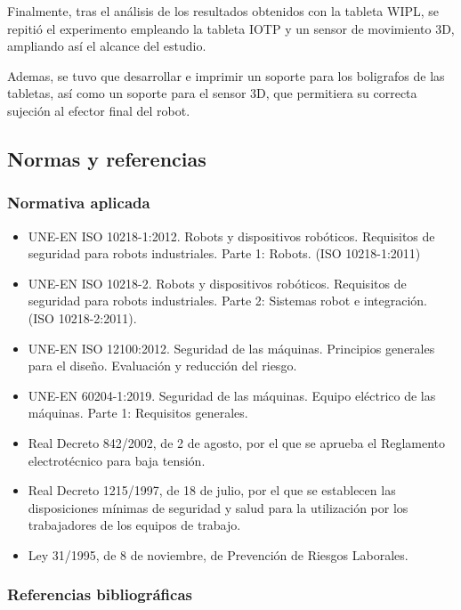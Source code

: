 \documentclass[12pt,a4paper,oneside]{report}
\begin{document}
Finalmente, tras el análisis de los resultados obtenidos con la tableta \acrfull{WIPL}, 
se repitió el experimento empleando la tableta \acrfull{IOTP} y un sensor de movimiento 3D, 
ampliando así el alcance del estudio. 

Ademas, se tuvo que desarrollar e imprimir un soporte para los boligrafos de las tabletas,
así como un soporte para el sensor 3D, que permitiera su correcta sujeción al efector final del robot.


\subsection{Normas y referencias}
\subsubsection{Normativa aplicada}
\begin{itemize}
  \item UNE-EN ISO 10218-1:2012. Robots y dispositivos robóticos. Requisitos de seguridad
para robots industriales. Parte 1: Robots. (ISO 10218-1:2011)
  \item UNE-EN ISO 10218-2. Robots y dispositivos robóticos. Requisitos de seguridad para
robots industriales. Parte 2: Sistemas robot e integración. (ISO 10218-2:2011).
  \item UNE-EN ISO 12100:2012. Seguridad de las máquinas. Principios generales 
  para el diseño. Evaluación y reducción del riesgo.
  \item UNE-EN 60204-1:2019. Seguridad de las máquinas. Equipo 
  eléctrico de las máquinas. Parte 1: Requisitos generales.
  \item Real Decreto 842/2002, de 2 de agosto, por el que se aprueba el Reglamento electrotécnico
para baja tensión.
  \item Real Decreto 1215/1997, de 18 de julio, por el que se establecen las disposiciones mínimas
de seguridad y salud para la utilización por los trabajadores de los equipos de
trabajo.
  \item Ley 31/1995, de 8 de noviembre, de Prevención de Riesgos Laborales.

\end{itemize}

\subsubsection{Referencias bibliográficas}
\printbibliography[heading=none]
\end{document}
